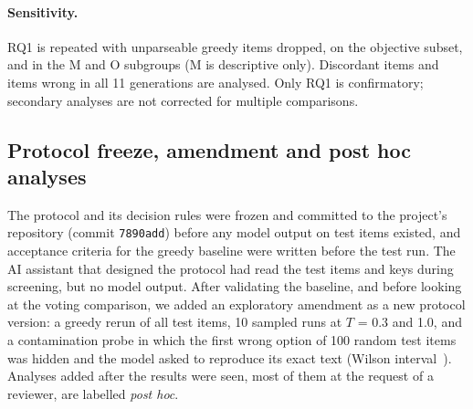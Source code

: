 \paragraph{Sensitivity.} RQ1 is repeated with unparseable greedy items dropped, on the objective subset, and in the M
and O subgroups (M is descriptive only). Discordant items and items wrong in all 11 generations are analysed. Only
RQ1 is confirmatory; secondary analyses are not corrected for multiple comparisons.

\subsection{Protocol freeze, amendment and post hoc analyses}
The protocol and its decision rules were frozen and committed to the project's repository (commit \texttt{7890add})
before any model output on test items existed, and acceptance criteria for the greedy baseline were written before
the test run. The AI assistant that designed the protocol had read the test items and keys during screening, but no
model output. After validating the baseline, and before looking at the voting comparison, we added an exploratory
amendment as a new protocol version: a greedy rerun of all test items, 10 sampled runs at $T$ = 0.3 and 1.0, and a
contamination probe in which the first wrong option of 100 random test items was hidden and the model asked to
reproduce its exact text (Wilson interval~\cite{wilson1927}). Analyses added after the results were seen, most of them
at the request of a reviewer, are labelled \emph{post hoc}.
